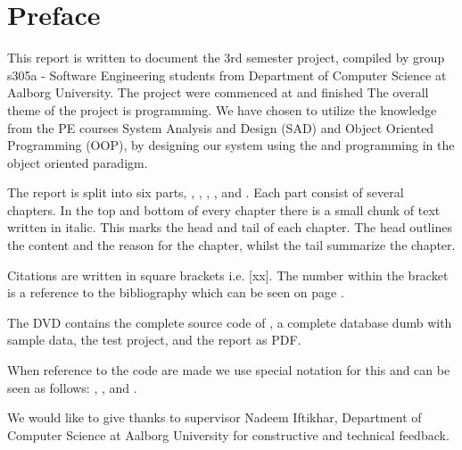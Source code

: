 \chapter*{Preface}
\label{chap:preface}
%
\emptyTop{}%
\vspace{-15mm}%
This report is written to document the 3rd semester project, compiled by group s305a
- Software Engineering students from Department of Computer Science at Aalborg University. 
The project were commenced at  and finished 
The overall theme of the project is programming. 
We have chosen to utilize the knowledge from the PE courses System Analysis and Design (SAD) and Object Oriented Programming (OOP), by designing our system using the \ooad and programming \hdesk in the object oriented paradigm.  

The report is split into six parts, , , , , and . Each part consist of several chapters. In the top and bottom of every chapter there is a small chunk of text written in italic. This marks the head and tail of each chapter. The head outlines the content and the reason for the chapter, whilst the tail summarize the chapter. 

Citations are written in square brackets i.e. [xx]. The number within the bracket is a reference to the bibliography which can be seen on page \pageref{chap:bib}.

The DVD contains the complete source code of \hdesk[], a complete database dumb with sample data, the test project, and the report as PDF.  

When reference to the code are made we use special notation for this and can be seen as follows: , ,  and .

We would like to give thanks to supervisor Nadeem Iftikhar, Department of Computer Science at Aalborg University for constructive and technical feedback.




